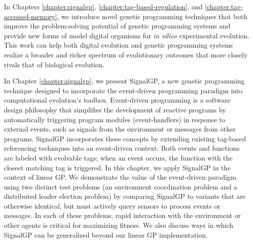 
In Chapters \ref{chapter:signalgp}, \ref{chapter:tag-based-regulation}, and \ref{chapter:tag-accessed-memory}, we introduce novel genetic programming techniques that both improve the problem-solving potential of genetic programming systems and provide new forms of model digital organisms for \textit{in silico} experimental evolution.
This work can help both digital evolution and genetic programming systems realize a broader and richer spectrum of evolutionary outcomes that more closely rivals that of biological evolution.

In Chapter \ref{chapter:signalgp}, we present SignalGP, a new genetic programming technique designed to incorporate the event-driven programming paradigm into computational evolution's toolbox. 
Event-driven programming is a software design philosophy that simplifies the development of reactive programs by automatically triggering program modules (event-handlers) in response to external events, such as signals from the environment or messages from other programs. 
SignalGP incorporates these concepts by extending existing tag-based referencing techniques into an event-driven context. 
Both events and functions are labeled with evolvable tags; when an event occurs, the function with the closest matching tag is triggered. 
In this chapter, we apply SignalGP in the context of linear GP. 
We demonstrate the value of the event-driven paradigm using two distinct test problems (an environment coordination problem and a distributed leader election problem) by comparing SignalGP to variants that are otherwise identical, but must actively query sensors to process events or messages. 
In each of these problems, rapid interaction with the environment or other agents is critical for maximizing fitness. 
We also discuss ways in which SignalGP can be generalized beyond our linear GP implementation.

